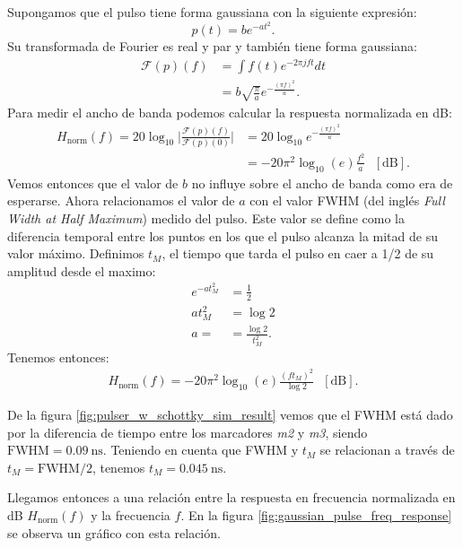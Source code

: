 Supongamos que el pulso tiene forma gaussiana con la siguiente expresión:
\begin{equation}
\label{eq:gaussian_pulse}
p(t) = b e^{-a t^2}.
\end{equation}
Su transformada de Fourier es real y par y también tiene forma gaussiana:
\begin{align}
    \mathcal{F}(p)(f) &= \int f(t) e^{-2\pi j f t} dt\\
    &= b\sqrt{\frac{\pi}{a}} e^{-\frac{(\pi f)^2}{a}}.
\end{align}
Para medir el ancho de banda podemos calcular la respuesta normalizada en dB:
\begin{align}
    H_{\text{norm}}(f) = 20 \log_{10} \bigg| \frac{\mathcal{F}(p)(f)}{\mathcal{F}(p)(0)}\bigg|  & = 20 \log_{10} e^{-\frac{(\pi f)^2}{a}}\\
 &= -20 \pi^2 \log_{10}(e) \frac{f^2}{a} \ \ \ [\text{dB}].
\end{align}
Vemos entonces que el valor de $b$ no influye sobre el ancho de banda como era
de esperarse. Ahora relacionamos el valor de $a$ con el valor FWHM (del inglés
\textit{Full Width at Half Maximum}) medido del pulso. Este valor se define como
la diferencia temporal entre los puntos en los que el pulso alcanza la mitad de
su valor máximo. Definimos $t_M$, el tiempo que tarda el pulso en caer a 1/2 de
su amplitud desde el maximo:
\begin{align}
    e^{-a t_M^2} &= \frac{1}{2}\\
    a t_M^2 &= \log 2 \\
    a = &= \frac{\log 2}{t_M^2}.
    \label{eq:gaussian_a_expression}
\end{align}
Tenemos entonces:
\begin{align}
    H_{\text{norm}}(f) = -20 \pi^2 \log_{10}(e) \frac{(f t_M)^2}{\log 2} \ \ \
    [\text{dB}].
\end{align}

De la figura \ref{fig:pulser_w_schottky_sim_result} vemos que el FWHM está dado
por la diferencia de tiempo entre los marcadores \textit{m2} y \textit{m3},
siendo $\text{FWHM} = \qty{0.09}{\nano\second}$. Teniendo en cuenta que FWHM y
$t_M$ se relacionan a través de $t_M=\text{FWHM}/2$, tenemos
$t_M=\qty{0.045}{\nano\second}$.

Llegamos entonces a una relación entre la respuesta en frecuencia normalizada en
dB $H_{\text{norm}}(f)$ y la frecuencia $f$. En la figura
\ref{fig:gaussian_pulse_freq_response} se observa un gráfico con esta relación.

